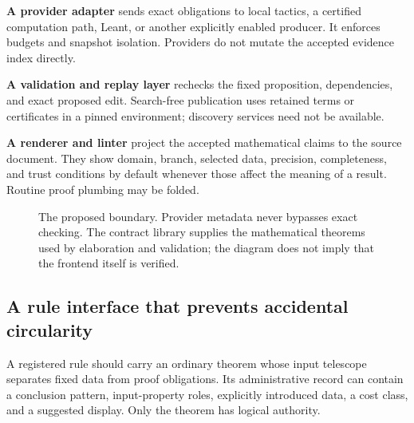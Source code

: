 \documentclass[11pt,letterpaper]{article}
\theoremstyle{definition}
\theoremstyle{remark}
\begin{document}
\textbf{A provider adapter} sends exact obligations to local tactics, a certified
computation path, Leant, or another explicitly enabled producer. It enforces
budgets and snapshot isolation. Providers do not mutate the accepted evidence
index directly.

\textbf{A validation and replay layer} rechecks the fixed proposition, dependencies,
and exact proposed edit. Search-free publication uses retained terms or
certificates in a pinned environment; discovery services need not be available.

\textbf{A renderer and linter} project the accepted mathematical claims to the
source document. They show domain, branch, selected data, precision,
completeness, and trust conditions by default whenever those affect the meaning
of a result. Routine proof plumbing may be folded.

\begin{figure}[htbp]
\centering
{}
\caption{The proposed boundary. Provider metadata never bypasses exact checking.
The contract library supplies the mathematical theorems used by elaboration and
validation; the diagram does not imply that the frontend itself is verified.}
\end{figure}

\subsection{A rule interface that prevents accidental circularity}
A registered rule should carry an ordinary theorem whose input telescope
separates fixed data from proof obligations. Its administrative record can
contain a conclusion pattern, input-property roles, explicitly introduced data,
a cost class, and a suggested display. Only the theorem has logical authority.
\end{document}
